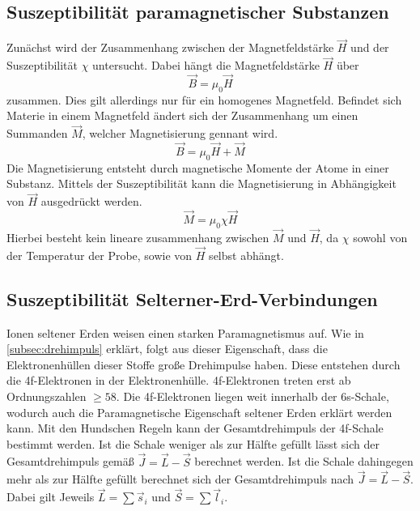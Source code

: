 \subsection{Suszeptibilität paramagnetischer Substanzen}
\label{subsec:Berechnung}

Zunächst wird der Zusammenhang zwischen der Magnetfeldstärke $\vec{H}$ und der Suszeptibilität $\chi$ untersucht. Dabei hängt die Magnetfeldstärke $\vec{H}$ über 
\begin{equation*}
    \vec{B} = \mu_0 \vec{H}
\end{equation*}
zusammen. Dies gilt allerdings nur für ein homogenes Magnetfeld. Befindet sich Materie in einem Magnetfeld ändert sich der Zusammenhang um einen Summanden $\vec{M}$, welcher 
Magnetisierung gennant wird.
\begin{equation}
    \label{eqn:magnetfeld}
    \vec{B} = \mu_0 \vec{H} + \vec{M}
\end{equation}
Die Magnetisierung entsteht durch magnetische Momente der Atome in einer Substanz. Mittels der Suszeptibilität kann die Magnetisierung in Abhängigkeit von $\vec{H}$
ausgedrückt werden. 
\begin{equation}
    \label{eqn:Mchi}
    \vec{M} = \mu_0 \chi \vec{H}
\end{equation}
Hierbei besteht kein lineare zusammenhang zwischen $\vec{M}$ und $\vec{H}$, da $\chi$ sowohl von der Temperatur der Probe, sowie von $\vec{H}$ selbst abhängt.

\subsection{Suszeptibilität Selterner-Erd-Verbindungen}
\label{subsec:suzepseltenererden}
Ionen seltener Erden weisen einen starken Paramagnetismus auf. Wie in \autoref{subsec:drehimpuls} erklärt, folgt aus dieser Eigenschaft, dass die Elektronenhüllen dieser Stoffe
große Drehimpulse haben. Diese entstehen durch die 4f-Elektronen in der Elektronenhülle. 4f-Elektronen treten erst ab Ordnungszahlen $\geq 58$. Die 4f-Elektronen liegen weit
innerhalb der 6s-Schale, wodurch auch die Paramagnetische Eigenschaft seltener Erden erklärt werden kann. Mit den Hundschen Regeln kann der Gesamtdrehimpuls der 4f-Schale
bestimmt werden. Ist die Schale weniger als zur Hälfte gefüllt lässt sich der Gesamtdrehimpuls gemäß $\vec{J} = \vec{L} - \vec{S}$ berechnet werden. Ist die Schale dahingegen 
mehr als zur Hälfte gefüllt berechnet sich der Gesamtdrehimpuls nach $\vec{J} = \vec{L} - \vec{S}$. Dabei gilt Jeweils $\vec{L} = \sum \vec{s}_i$ und $\vec{S} = \sum \vec{l}_i$. 

